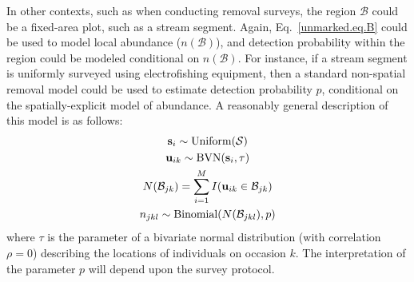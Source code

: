 In other contexts, such as when conducting removal surveys, the region
$\mathcal{B}$ could be a fixed-area plot, such as a stream
segment. Again, Eq.~\ref{unmarked.eq.B} could be used to model local
abundance ($n(\mathcal{B})$), and detection probability within the region could be
modeled conditional on $n(\mathcal{B})$. For instance, if a stream
segment is uniformly surveyed using electrofishing equipment, then a
standard non-spatial removal model could be used to estimate detection
probability $p$, conditional on the spatially-explicit model of
abundance. A reasonably general description of this model is as
follows:
\begin{gather*}
  {\bf s}_i \sim \text{Uniform}(\mathcal{S}) \\
  {\bf u}_{ik} \sim \text{BVN}({\bf s}_i, \tau) \\
  N(\mathcal{B}_{jk}) = \sum_{i=1}^M I({\bf u}_{ik} \in \mathcal{B}_{jk}) \\
  n_{jkl} \sim \text{Binomial}(N(\mathcal{B}_{jkl}), p)
\end{gather*}
where $\tau$ is the parameter of a bivariate normal distribution (with
correlation $\rho=0$) describing the locations of individuals on occasion
$k$. The interpretation of the parameter $p$ will depend upon the
survey protocol.

